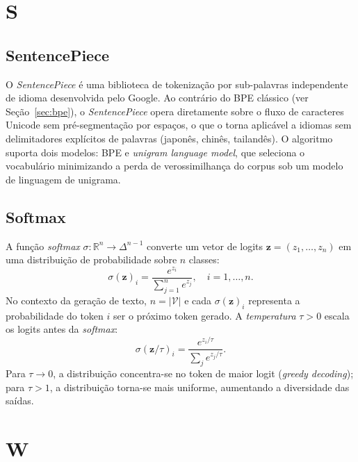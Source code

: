 \section*{S}

\subsection*{SentencePiece}
\label{sec:sentencepiece}

O \textit{SentencePiece} é uma biblioteca de tokenização por sub-palavras
independente de idioma desenvolvida pelo Google. Ao contrário do BPE clássico
(ver Seção~\ref{sec:bpe}), o \textit{SentencePiece} opera diretamente sobre
o fluxo de caracteres Unicode sem pré-segmentação por espaços, o que o torna
aplicável a idiomas sem delimitadores explícitos de palavras (japonês, chinês,
tailandês). O algoritmo suporta dois modelos: BPE e \textit{unigram language
model}, que seleciona o vocabulário minimizando a perda de verossimilhança do
corpus sob um modelo de linguagem de unigrama.

\subsection*{Softmax}
\label{sec:softmax}

A função \textit{softmax} $\sigma: \mathbb{R}^n \to \Delta^{n-1}$ converte
um vetor de logits $\mathbf{z} = (z_1, \ldots, z_n)$ em uma distribuição de
probabilidade sobre $n$ classes:
\[
  \sigma(\mathbf{z})_i = \frac{e^{z_i}}{\sum_{j=1}^{n} e^{z_j}}, \quad i = 1, \ldots, n.
\]
No contexto da geração de texto, $n = |\mathcal{V}|$ e cada $\sigma(\mathbf{z})_i$
representa a probabilidade do token $i$ ser o próximo token gerado. A
\emph{temperatura} $\tau > 0$ escala os logits antes da \textit{softmax}:
\[
  \sigma(\mathbf{z}/\tau)_i = \frac{e^{z_i/\tau}}{\sum_j e^{z_j/\tau}}.
\]
Para $\tau \to 0$, a distribuição concentra-se no token de maior logit
(\textit{greedy decoding}); para $\tau > 1$, a distribuição torna-se mais
uniforme, aumentando a diversidade das saídas.

\section*{W}

